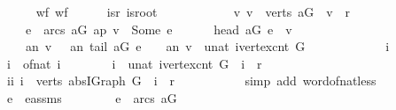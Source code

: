 \begin{isabellebody}
\isanewline
\ \ \ \ \isamarkupfalse%
\ wf{\isacharcolon}\ {\isachardoublequoteopen}{\isacharquery}wf{\isachardoublequoteclose}\isanewline
\ \ \ \ \isamarkupfalse%
\ isr{\isacharcolon}\ {\isachardoublequoteopen}{\isacharquery}is{\isacharunderscore}root{\isachardoublequoteclose}\ \ \ \ \isanewline
\ \ \ \ \isamarkupfalse%
\ {\isacharasterisk}{\isacharcolon}\ {\isachardoublequoteopen}{\isasymAnd}\ v{\isachardot}\ v\ {\isasymin}\ verts\ {\isacharquery}aG\ {\isasymand}\ v\ {\isasymnoteq}\ r\ {\isasymLongrightarrow}\isanewline
\ \ \ \ {\isacharparenleft}{\isasymexists}e\ {\isasymin}\ arcs\ {\isacharquery}aG{\isachardot}\ {\isacharquery}ap\ v\ {\isacharequal}\ Some\ e\ {\isasymand}\ \isanewline
\ \ \ \ head\ {\isacharquery}aG\ e\ {\isacharequal}\ v\ {\isasymand}\ \isanewline
\ \ \ \ {\isacharquery}an\ v\ {\isacharequal}\ \ {\isacharquery}an\ {\isacharparenleft}tail\ {\isacharquery}aG\ e{\isacharparenright}\ {\isacharplus}\ {}{\isacharparenright}\ {\isasymand}\ {\isacharparenleft}{\isacharquery}an\ v\ {\isacharless}\ unat\ {\isacharparenleft}ivertex{\isacharunderscore}cnt\ G{\isacharparenright}{\isacharparenright}{\isachardoublequoteclose}\isanewline
\ \ \ \ \isacommand{{\isacharbraceleft}}\isamarkupfalse%
\isanewline
\ \ \ \ \ \ \isamarkupfalse%
\ i\ \isanewline
\ \ \ \ \ \ \isamarkupfalse%
\ {\isacharquery}i\ {\isacharequal}\ {\isachardoublequoteopen}of{\isacharunderscore}nat\ i{\isachardoublequoteclose}\isanewline
\ \ \ \ \ \ \isamarkupfalse%
\ {\isachardoublequoteopen}i\ {\isacharless}\ unat\ {\isacharparenleft}ivertex{\isacharunderscore}cnt\ G{\isacharparenright}\ {\isasymand}\ {\isacharquery}i\ {\isasymnoteq}\ r{\isachardoublequoteclose}\isanewline
\ \ \ \ \ \ \isamarkupfalse%
\ \isamarkupfalse%
\ ii{\isacharcolon}\ {\isachardoublequoteopen}{\isacharquery}i\ {\isasymin}\ verts\ {\isacharparenleft}abs{\isacharunderscore}IGraph\ G{\isacharparenright}\ {\isasymand}\ {\isacharquery}i\ {\isasymnoteq}\ r{\isachardoublequoteclose}\ \isanewline
\ \ \ \ \ \ \ \ \isamarkupfalse%
\ {\isacharparenleft}simp\ add{\isacharcolon}\ word{\isacharunderscore}of{\isacharunderscore}nat{\isacharunderscore}less{\isacharparenright}\isanewline
\ \ \ \ \ \ \isamarkupfalse%
\ \isamarkupfalse%
\ e\ \ e{\isacharunderscore}assms{\isacharcolon}\isanewline
\ \ \ \ \ \ \ \ {\isachardoublequoteopen}e\ {\isasymin}\ arcs\ {\isacharquery}aG{\isachardoublequoteclose}\ \isanewline

\end{isabellebody}
